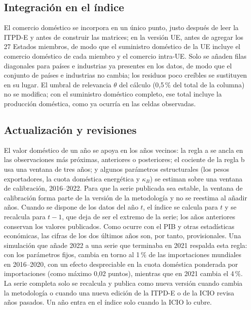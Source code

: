 \documentclass[final,1p,times,authoryear]{elsarticle}
\begin{document}
\subsection{Integración en el índice}
El comercio doméstico se incorpora en un único punto, justo después de leer la ITPD-E y antes de construir las matrices; en la versión UE, antes de agregar los 27 Estados miembros, de modo que el suministro doméstico de la UE incluye el comercio doméstico de cada miembro y el comercio intra-UE. Solo se añaden filas diagonales para países e industrias ya presentes en los datos, de modo que el conjunto de países e industrias no cambia; los residuos poco creíbles se sustituyen en su lugar. El umbral de relevancia $\theta$ del cálculo (0,5\,\% del total de la columna) no se modifica; con el suministro doméstico completo, ese total incluye la producción doméstica, como ya ocurría en las celdas observadas.

\subsection{Actualización y revisiones}\label{subsec:revisiones}
El valor doméstico de un año se apoya en los años vecinos: la regla a se ancla en las observaciones más próximas, anteriores o posteriores; el cociente de la regla b usa una ventana de tres años; y algunos parámetros estructurales (los pesos exportadores, la cuota doméstica energética y $\kappa_B$) se estiman sobre una ventana de calibración, 2016--2022. Para que la serie publicada sea estable, la ventana de calibración forma parte de la versión de la metodología y no se reestima al añadir años. Cuando se dispone de los datos del año $t$, el índice se calcula para $t$ y se recalcula para $t-1$, que deja de ser el extremo de la serie; los años anteriores conservan los valores publicados. Como ocurre con el PIB y otras estadísticas económicas, las cifras de los dos últimos años son, por tanto, provisionales. Una simulación que añade 2022 a una serie que terminaba en 2021 respalda esta regla: con los parámetros fijos, cambia en torno al 1\,\% de las importaciones mundiales en 2016--2020, con un efecto despreciable en la cuota doméstica ponderada por importaciones (como máximo 0,02 puntos), mientras que en 2021 cambia el 4\,\%. La serie completa solo se recalcula y publica como nueva versión cuando cambia la metodología o cuando una nueva edición de la ITPD-E o de la ICIO revisa años pasados. Un año entra en el índice solo cuando la ICIO lo cubre.
\end{document}
